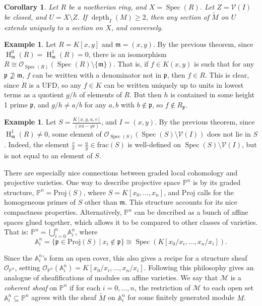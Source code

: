 \documentclass[11pt]{book}
\newtheorem{corollary}[theorem]{Corollary}
\numberwithin{equation}{section}
\numberwithin{theorem}{chapter}
\theoremstyle{definition}
\newtheorem{example}[theorem]{Example}
\newtheorem*{basic properties}{Basic Properties}
\newtheorem*{Important Remark}{Important Remark}
\theoremstyle{remark}
\newcommand{\PP}{\mathbb{P}}
\renewcommand{\AA}{\mathbb{A}}
\newcommand{\m}{\mathfrak{m}}
\newcommand{\V}{\mathcal{V}}
\newcommand{\p}{\mathfrak{p}}
\newcommand{\cM}{\mathcal{M}}
\newcommand{\Spec}{\operatorname{Spec}}
\newcommand{\depth}{\operatorname{depth}}
\renewcommand{\H}{\operatorname{H}}
\begin{document}
\begin{corollary}
	Let $R$ be a noetherian ring, and $X=\Spec(R)$. Let $Z=\V(I)$ be closed, and $U=X\setminus Z$. If $\depth_I(M)\geq 2$, then any section of $\widetilde{M}$ on $U$ extends uniquely to a section on $X$, and conversely.
\end{corollary}

\begin{example}
	Let $R=K[x,y]$ and $\m=(x,y)$. By the previous theorem, since $\H^0_\m(R)=\H^1_\m(R)=0$, there is an isomorphism $R\cong \mathcal{O}_{\Spec(R)}(\Spec(R)\setminus\{\m\})$. That is, if $f \in K(x,y)$ is such that for any $\p \not\supseteq \m$, $f$ can be written with a denominator not in $\p$, then $f\in R$. This is clear, since $R$ is a UFD, so any $f\in K$ can be written uniquely up to units in lowest terms as a quotient $g/h$ of elements of $R$. But then $h$ is contained in some height 1 prime $\p$, and $g/h\neq a/b$ for any $a,b$ with $b\notin \p$, so $f\notin R_{\p}$.
\end{example}

\begin{example}
	Let $\displaystyle S=\frac{K[x,y,u,v]}{(xu-yv)}$, and $I=(x,y)$. By the previous theorem, since $\H^1_\m(R)\neq 0$, some element of $\mathcal{O}_{\Spec(S)}(\Spec(S)\setminus \V(I))$ does not lie in $S$. Indeed, the element $\displaystyle \frac{v}{x}=\frac{u}{y} \in \mathrm{frac}(S)$ is well-defined on $\Spec(S)\setminus \V(I)$, but is not equal to an element of $S$.
\end{example}



There are especially nice connections between graded local cohomology and projective varieties. One way to describe projective space $\PP^n$ is by its graded structure, $\PP^n=\mathrm{Proj}(S)$, where $S=K[x_0,\dots,x_n]$, and $\mathrm{Proj}$ calls for the homogeneous primes of $S$ other than $\m$. This structure accounts for its nice compactness properties. Alternatively, $\PP^n$ can be described as a bunch of affine spaces glued together, which allows it to be compared to other classes of varieties. That is: $\PP^n=\bigcup_{i=0}^n \AA^n_i$, where 
\[\AA^n_i=\{ \p \in \mathrm{Proj}(S) \ | \ x_i \notin \p \} \cong \Spec\left(K\left[{x_0}/{x_i},\dots,{x_n}/{x_i}\right]\right).\] 

Since the $\AA^n_i$'s form an open cover, this also gives a recipe for a structure sheaf $\mathcal{O}_{\PP^n}$, setting\index{$\mathcal{O}_{\PP^n}$} $\mathcal{O}_{\PP^n}(\AA^n_i)=K\left[{x_0}/{x_i},\dots,{x_n}/{x_i}\right]$. Following this philosophy gives an analogue of sheafifications of modules on affine varieties. We say that $\cM$ is a \emph{coherent sheaf} on $\PP^n$ if for each $i=0,\dots,n$, the restriction of $\cM$ to each open set $\AA^n_i\subseteq \PP^n$ agrees with the sheaf $\widetilde{M}$ on $\AA^n_i$ for some finitely generated module $M$.
\end{document}
